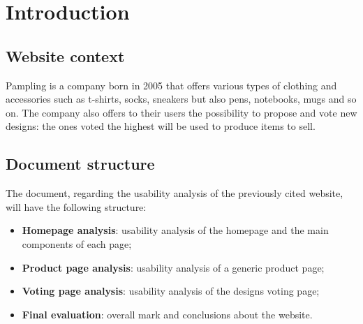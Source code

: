 \section{Introduction}

\subsection{Website context}
Pampling is a company born in 2005 that offers various types of clothing and accessories such as t-shirts, socks, sneakers but also pens, notebooks, mugs and so on. 
The company also offers to their users the possibility to propose and vote new designs: the ones voted the highest will be used to produce items to sell.

\subsection{Document structure}
The document, regarding the usability analysis of the previously cited website, will have the following structure:
\begin{itemize}
\item \textbf{Homepage analysis}: usability analysis of the homepage and the main components of each page;
\item \textbf{Product page analysis}: usability analysis of a generic product page;
\item \textbf{Voting page analysis}: usability analysis of the designs voting page;
\item \textbf{Final evaluation}: overall mark and conclusions about the website.
\end{itemize}



